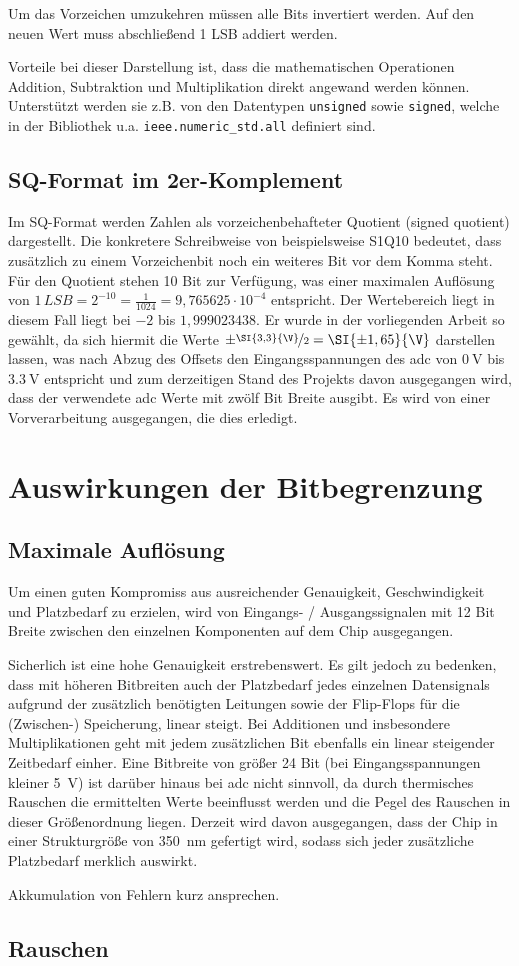 Um das Vorzeichen umzukehren müssen alle Bits invertiert werden. Auf den neuen Wert muss abschließend 1 LSB addiert werden.

Vorteile bei dieser Darstellung ist, dass die mathematischen Operationen Addition, Subtraktion und Multiplikation direkt angewand werden können. Unterstützt werden sie z.B. 
von den Datentypen \texttt{unsigned} sowie \texttt{signed}, welche in der Bibliothek u.a. \texttt{ieee.numeric\_std.all} definiert sind.




\subsection{SQ-Format im 2er-Komplement}

Im SQ-Format werden Zahlen als vorzeichenbehafteter Quotient (signed quotient) dargestellt. Die konkretere Schreibweise von beispielsweise S1Q10 bedeutet, dass zusätzlich zu
einem Vorzeichenbit noch ein weiteres Bit vor dem Komma steht. Für den Quotient stehen 10 Bit zur Verfügung, was einer maximalen Auflösung  von 
$1\,LSB = 2^{-10} = \frac{1}{1024} = 9,765625\cdot10^{-4}$ entspricht. Der Wertebereich liegt in diesem Fall liegt bei $-2$ bis $1,999023438$. Er wurde in der vorliegenden 
Arbeit so gewählt, da sich hiermit die Werte $\pm\nicefrac{\SI{3,3}{\V}}{2} = \SI{\pm1,65}{\V}$ darstellen lassen, was nach Abzug des Offsets den Eingangsspannungen des \gls{adc}
von $\SI{0}{\V}$ bis $\SI{3,3}{\V}$ entspricht und zum derzeitigen Stand des Projekts davon ausgegangen wird, dass der verwendete \gls{adc} Werte mit zwölf Bit Breite ausgibt. 
Es wird von einer Vorverarbeitung ausgegangen, die dies erledigt.




\section{Auswirkungen der Bitbegrenzung}
\subsection{Maximale Auflösung}

Um einen guten Kompromiss aus ausreichender Genauigkeit, Geschwindigkeit und Platzbedarf zu erzielen, wird von Eingangs- / Ausgangssignalen mit 12 Bit Breite zwischen
den einzelnen Komponenten auf dem Chip ausgegangen.

Sicherlich ist eine hohe Genauigkeit erstrebenswert. Es gilt jedoch zu bedenken, dass mit höheren Bitbreiten auch der Platzbedarf jedes einzelnen Datensignals aufgrund der 
zusätzlich benötigten Leitungen sowie der Flip-Flops für die (Zwischen-) Speicherung, linear steigt. 
Bei Additionen und insbesondere Multiplikationen geht mit jedem zusätzlichen Bit ebenfalls ein linear steigender Zeitbedarf einher.
Eine Bitbreite von größer 24 Bit (bei Eingangsspannungen kleiner \SI{5}{V}) ist darüber hinaus bei \gls{adc} nicht sinnvoll, da durch thermisches Rauschen die ermittelten 
Werte beeinflusst werden und die Pegel des Rauschen in dieser Größenordnung liegen.
Derzeit wird davon ausgegangen, dass der Chip in einer Strukturgröße von \SI{350}{nm} gefertigt wird, sodass sich jeder zusätzliche Platzbedarf merklich auswirkt.

Akkumulation von Fehlern kurz ansprechen.
 
\subsection{Rauschen}

